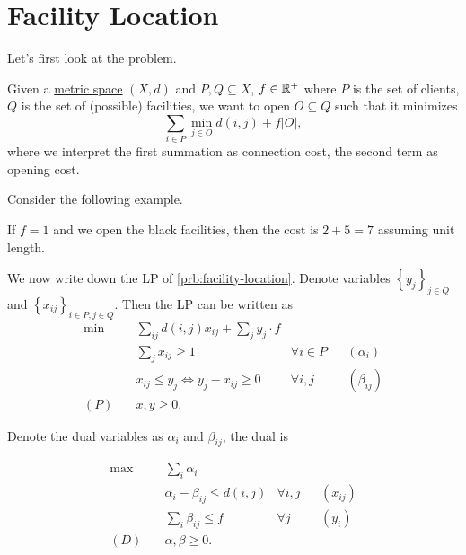 \section{Facility Location}
Let's first look at the problem.

\begin{problem}\label{prb:facility-location}
Given a \hyperref[rmk:metric-space]{metric space} \((X, d)\) and \(P,  Q\subseteq X\), \(f\in \mathbb{\MakeUppercase{r}} ^+\) where \(P\) is the set of clients, \(Q\) is the set of (possible) facilities, we want to open \(O \subseteq Q\) such that it minimizes
\[
	\sum_{i\in P} \min _{j\in O} d(i, j) + f\left\vert O \right\vert,
\]
where we interpret the first summation as connection cost, the second term as opening cost.
\end{problem}

\begin{eg}
	Consider the following example.
	\begin{center}
	\end{center}
	If \(f = 1\) and we open the black facilities, then the cost is \(2 + 5 = 7\) assuming unit length.
\end{eg}

We now write down the LP of \autoref{prb:facility-location}. Denote variables \(\left\{ y_{j} \right\}_{j\in Q}\) and \(\left\{ x_{ij} \right\}_{i\in P, j\in Q}\). Then the LP can be written as
\begin{align*}
	\min~    & \sum_{ij} d(i, j) x_{ij} + \sum_{j} y_{j} \cdot f                                     \\
	         & \sum_{j}x_{ij} \geq 1                             & \forall i\in P &  & (\alpha _i)   \\
	         & x_{ij} \leq y_j \iff y_j - x_{ij} \geq 0          & \forall i, j   &  & (\beta_{ij} ) \\
	(P)\quad & x, y \geq 0.
\end{align*}

Denote the dual variables as \(\alpha _i\) and \(\beta_{ij} \), the dual is

\begin{align*}
	\max~    & \sum_{i} \alpha _i                                                 \\
	         & \alpha _i - \beta _{ij} \leq d(i, j) & \forall i, j &  & (x_{ij} ) \\
	         & \sum_{i} \beta _{ij} \leq f          & \forall j    &  & (y_i)     \\
	(D)\quad & \alpha , \beta \geq 0.
\end{align*}

